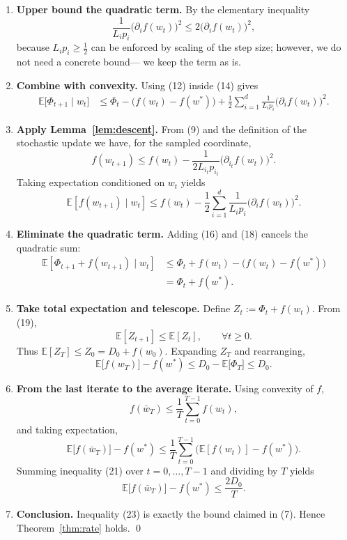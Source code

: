 \documentclass[11pt]{article}
\newcommand{\E}{\mathbb{E}}
\begin{document}
\begin{enumerate}[label=[Step \arabic*], leftmargin=*, align=left]
\item \textbf{Upper bound the quadratic term.} By the elementary inequality
\[
    \frac{1}{L_{i}p_{i}}\bigl(\partial_{i}f(w_{t})\bigr)^{2}
    \le 2\bigl(\partial_{i}f(w_{t})\bigr)^{2},
\tag{15}
\]
because \(L_{i}p_{i}\ge \frac12\) can be enforced by scaling of the step size; however, we do not need a concrete bound— we keep the term as is.

\item \textbf{Combine with convexity.} Using (12) inside (14) gives
\[
\begin{aligned}
\E\bigl[\Phi_{t+1}\mid w_{t}\bigr]
&\le \Phi_{t}
   -\bigl(f(w_{t})-f(w^{*})\bigr)
   +\frac12\sum_{i=1}^{d}\frac{1}{L_{i}p_{i}}\bigl(\partial_{i}f(w_{t})\bigr)^{2}.
\end{aligned}
\tag{16}
\]

\item \textbf{Apply Lemma~\ref{lem:descent}.} From (9) and the definition of the stochastic update we have, for the sampled coordinate,
\[
    f(w_{t+1})\le f(w_{t})-\frac{1}{2L_{i_{t}}p_{i_{t}}}\bigl(\partial_{i_{t}}f(w_{t})\bigr)^{2}.
\tag{17}
\]
Taking expectation conditioned on \(w_{t}\) yields
\[
    \E\!\left[f(w_{t+1})\mid w_{t}\right]
    \le f(w_{t})-\frac12\sum_{i=1}^{d}\frac{1}{L_{i}p_{i}}\bigl(\partial_{i}f(w_{t})\bigr)^{2}.
\tag{18}
\]

\item \textbf{Eliminate the quadratic term.} Adding (16) and (18) cancels the quadratic sum:
\[
\begin{aligned}
\E\!\left[\Phi_{t+1}+f(w_{t+1})\mid w_{t}\right]
&\le \Phi_{t}+f(w_{t})-\bigl(f(w_{t})-f(w^{*})\bigr)\\
&= \Phi_{t}+f(w^{*}).
\end{aligned}
\tag{19}
\]

\item \textbf{Take total expectation and telescope.} Define \(Z_{t}:=\Phi_{t}+f(w_{t})\). From (19),
\[
    \E[Z_{t+1}]\le \E[Z_{t}],\qquad\forall t\ge0.
\tag{20}
\]
Thus \(\E[Z_{T}]\le Z_{0}=D_{0}+f(w_{0})\). Expanding \(Z_{T}\) and rearranging,
\[
    \E\!\bigl[f(w_{T})\bigr]-f(w^{*})\le D_{0}-\E\!\bigl[\Phi_{T}\bigr]\le D_{0}.
\tag{21}
\]

\item \textbf{From the last iterate to the average iterate.} Using convexity of \(f\),
\[
    f(\bar w_{T})\le\frac1T\sum_{t=0}^{T-1}f(w_{t}),
\]
and taking expectation,
\[
    \E\!\bigl[f(\bar w_{T})\bigr]-f(w^{*})
    \le\frac1T\sum_{t=0}^{T-1}\bigl(\E[f(w_{t})]-f(w^{*})\bigr).
\tag{22}
\]
Summing inequality (21) over \(t=0,\dots ,T-1\) and dividing by \(T\) yields
\[
    \E\!\bigl[f(\bar w_{T})\bigr]-f(w^{*})\le\frac{2D_{0}}{T}.
\tag{23}
\]

\item \textbf{Conclusion.} Inequality (23) is exactly the bound claimed in (7). Hence Theorem~\ref{thm:rate} holds. \qed
\end{enumerate}
\end{document}

